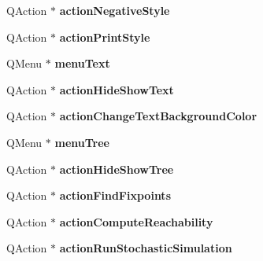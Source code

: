 \begin{DoxyCompactItemize}
\item 
\hypertarget{class_main_window_a626146e0315df36a9d0c1afc73c4b8a9}{\-Q\-Action $\ast$ {\bfseries action\-Negative\-Style}}\label{class_main_window_a626146e0315df36a9d0c1afc73c4b8a9}

\item 
\hypertarget{class_main_window_a9f939857be21b16cab10fba41ff0e242}{\-Q\-Action $\ast$ {\bfseries action\-Print\-Style}}\label{class_main_window_a9f939857be21b16cab10fba41ff0e242}

\item 
\hypertarget{class_main_window_a606eaf5ca6bb26e0f4fdd5eb8aa84c58}{\-Q\-Menu $\ast$ {\bfseries menu\-Text}}\label{class_main_window_a606eaf5ca6bb26e0f4fdd5eb8aa84c58}

\item 
\hypertarget{class_main_window_a9b47436992df37538bc31e2d4d8ee067}{\-Q\-Action $\ast$ {\bfseries action\-Hide\-Show\-Text}}\label{class_main_window_a9b47436992df37538bc31e2d4d8ee067}

\item 
\hypertarget{class_main_window_a942f0384b4c4185504c810f5104faebc}{\-Q\-Action $\ast$ {\bfseries action\-Change\-Text\-Background\-Color}}\label{class_main_window_a942f0384b4c4185504c810f5104faebc}

\item 
\hypertarget{class_main_window_a0eebe45643eed419e08ddb8bd8da2a57}{\-Q\-Menu $\ast$ {\bfseries menu\-Tree}}\label{class_main_window_a0eebe45643eed419e08ddb8bd8da2a57}

\item 
\hypertarget{class_main_window_aca06fa2f83fb7500cc11543768067ae2}{\-Q\-Action $\ast$ {\bfseries action\-Hide\-Show\-Tree}}\label{class_main_window_aca06fa2f83fb7500cc11543768067ae2}

\item 
\hypertarget{class_main_window_a04048deb025090490f7261002a4ea4ab}{\-Q\-Action $\ast$ {\bfseries action\-Find\-Fixpoints}}\label{class_main_window_a04048deb025090490f7261002a4ea4ab}

\item 
\hypertarget{class_main_window_a2d5f7f2433aab9c8005c197bc96cdbc9}{\-Q\-Action $\ast$ {\bfseries action\-Compute\-Reachability}}\label{class_main_window_a2d5f7f2433aab9c8005c197bc96cdbc9}

\item 
\hypertarget{class_main_window_ae1ed3e80e7e9dc6e0687729e68071c37}{\-Q\-Action $\ast$ {\bfseries action\-Run\-Stochastic\-Simulation}}\label{class_main_window_ae1ed3e80e7e9dc6e0687729e68071c37}


\end{DoxyCompactItemize}
